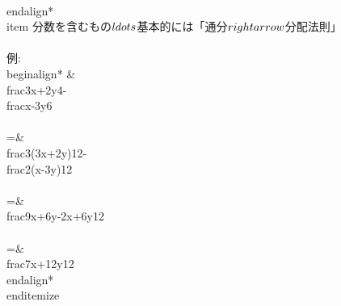 	\\end{align*}
 \\item 分数を含むもの$\\ldots$基本的には「通分$\\rightarrow$分配法則」 \\\\
       例:
       \\begin{align*}
	 &\\frac{3x+2y}{4}-\\frac{x-3y}{6}\\\\
	=&\\frac{3(3x+2y)}{12}-\\frac{2(x-3y)}{12}\\\\
	=&\\frac{9x+6y-2x+6y}{12} \\\\
	=&\\frac{7x+12y}{12} 
       \\end{align*}
\\end{itemize}
